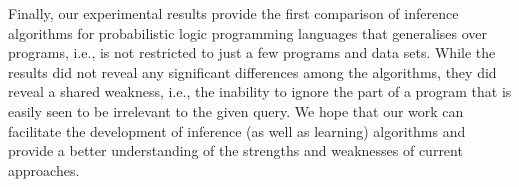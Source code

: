 \documentclass[runningheads]{llncs}
\begin{document}
Finally, our experimental results provide the first comparison of inference
algorithms for probabilistic logic programming languages that generalises over
programs, i.e., is not restricted to just a few programs and data sets. While
the results did not reveal any significant differences among the algorithms,
they did reveal a shared weakness, i.e., the inability to ignore the part of a
program that is easily seen to be irrelevant to the given query. We hope that
our work can facilitate the development of inference (as well as learning)
algorithms and provide a better understanding of the strengths and weaknesses of
current approaches.





\end{document}
